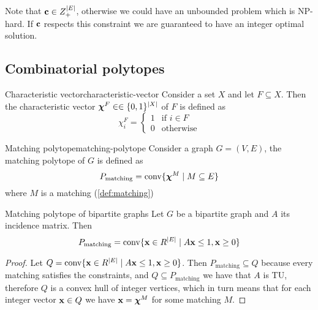 \documentclass[12pt]{extarticle}
\renewcommand{\vec}[1]{\bvec{#1}}
\begin{document}
Note that $\vec c \in Z^\abs{E}_+$, otherwise we could have an unbounded problem which is NP-hard.
If $\vec c$ respects this constraint we are guaranteed to have an integer optimal solution.

\subsection{Combinatorial polytopes}

\begin{definition}{Characteristic vector}{characteristic-vector}
	Consider a set $X$ and let $F \subseteq X$.
	Then the characteristic vector $\vec \chi^F \in \in \{0, 1\}^\abs{X}$ of $F$ is defined as
	\begin{equation}
		\chi^F_i = \begin{cases}
			1 & \text{if } i \in F \\
			0 & \text{otherwise}
		\end{cases}
	\end{equation}
\end{definition}

\begin{definition}{Matching polytope}{matching-polytope}
	Consider a graph $G = (V, E)$, the matching polytope of $G$ is defined as
	\begin{equation}
		P_\text{matching} = \mathrm{conv}\{ \vec \chi^M \mid M \subseteq E\}
	\end{equation}
	where $M$ is a matching (\cref{def:matching})
\end{definition}

\begin{lemma}{Matching polytope of bipartite graphs}{}
	Let $G$ be a bipartite graph and $A$ its incidence matrix. Then
	\begin{equation}
		P_\text{matching} = \mathrm{conv}\{ \vec x \in R^\abs{E} \mid A \vec x \leq 1, \vec x \geq 0\}
	\end{equation}
\end{lemma}

\begin{proof}
	Let $Q = \mathrm{conv}\{ \vec x \in R^\abs{E} \mid A \vec x \leq 1, \vec x \geq 0\}$.
	Then $P_\text{matching} \subseteq Q$ because every matching satisfies the constraints, and
	$Q \subseteq P_\text{matching}$ we have that $A$ is TU, therefore $Q$ is a convex hull of integer
	vertices, which in turn means that for each integer vector $\vec x \in Q$ we have
	$\vec x = \vec \chi^M$ for some matching $M$.
\end{proof}
\end{document}
